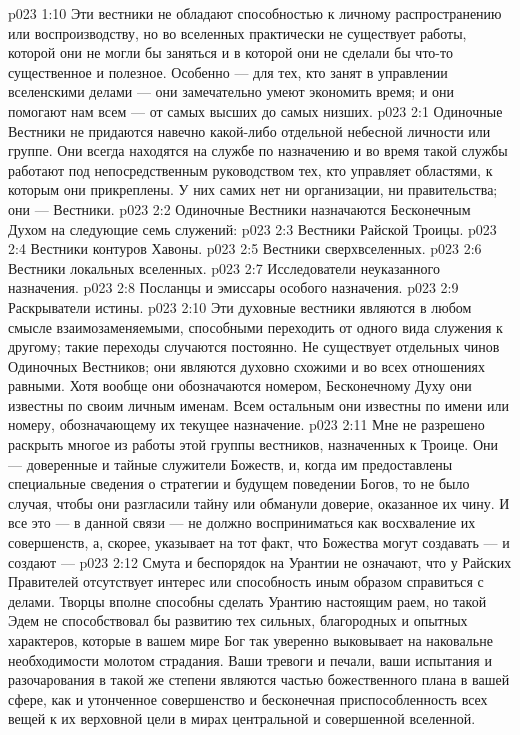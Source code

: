 \vs p023 1:10 \pc Эти вестники не обладают способностью к личному распространению или воспроизводству, но во вселенных практически не существует работы, которой они не могли бы заняться и в которой они не сделали бы что\hyp{}то существенное и полезное. Особенно --- для тех, кто занят в управлении вселенскими делами --- они замечательно умеют экономить время; и они помогают нам всем --- от самых высших до самых низших.
\vs p023 2:1 Одиночные Вестники не придаются навечно какой\hyp{}либо отдельной небесной личности или группе. Они всегда находятся на службе по назначению и во время такой службы работают под непосредственным руководством тех, кто управляет областями, к которым они прикреплены. У них самих нет ни организации, ни правительства; они ---  Вестники.
\vs p023 2:2 \pc Одиночные Вестники назначаются Бесконечным Духом на следующие семь служений:
\vs p023 2:3 \bibnobreakspace Вестники Райской Троицы.
\vs p023 2:4 \bibnobreakspace Вестники контуров Хавоны.
\vs p023 2:5 \bibnobreakspace Вестники сверхвселенных.
\vs p023 2:6 \bibnobreakspace Вестники локальных вселенных.
\vs p023 2:7 \bibnobreakspace Исследователи неуказанного назначения.
\vs p023 2:8 \bibnobreakspace Посланцы и эмиссары особого назначения.
\vs p023 2:9 \bibnobreakspace Раскрыватели истины.
\vs p023 2:10 \pc Эти духовные вестники являются в любом смысле взаимозаменяемыми, способными переходить от одного вида служения к другому; такие переходы случаются постоянно. Не существует отдельных чинов Одиночных Вестников; они являются духовно схожими и во всех отношениях равными. Хотя вообще они обозначаются номером, Бесконечному Духу они известны по своим личным именам. Всем остальным они известны по имени или номеру, обозначающему их текущее назначение.
\vs p023 2:11 \pc {}\bibnobreakspace {} Мне не разрешено раскрыть многое из работы этой группы вестников, назначенных к Троице. Они --- доверенные и тайные служители Божеств, и, когда им предоставлены специальные сведения о стратегии и будущем поведении Богов, то не было случая, чтобы они разгласили тайну или обманули доверие, оказанное их чину. И все это --- в данной связи --- не должно восприниматься как восхваление их совершенств, а, скорее, указывает на тот факт, что Божества могут создавать --- и создают --- 
\vs p023 2:12 Смута и беспорядок на Урантии не означают, что у Райских Правителей отсутствует интерес или способность иным образом справиться с делами. Творцы вполне способны сделать Урантию настоящим раем, но такой Эдем не способствовал бы развитию тех сильных, благородных и опытных характеров, которые в вашем мире Бог так уверенно выковывает на наковальне необходимости молотом страдания. Ваши тревоги и печали, ваши испытания и разочарования в такой же степени являются частью божественного плана в вашей сфере, как и утонченное совершенство и бесконечная приспособленность всех вещей к их верховной цели в мирах центральной и совершенной вселенной.

